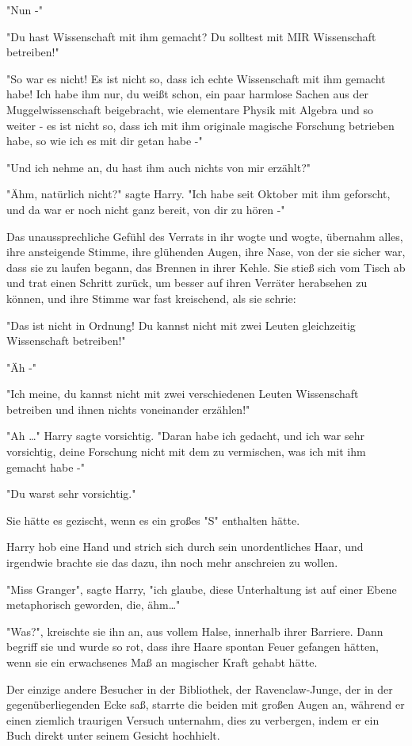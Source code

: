 {"Nun -"

"Du hast Wissenschaft mit ihm gemacht? Du solltest mit MIR Wissenschaft betreiben!"

"So war es nicht! Es ist nicht so, dass ich echte Wissenschaft mit ihm gemacht habe! Ich habe ihm nur, du weißt schon, ein paar harmlose Sachen aus der Muggelwissenschaft beigebracht, wie elementare Physik mit Algebra und so weiter - es ist nicht so, dass ich mit ihm originale magische Forschung betrieben habe, so wie ich es mit dir getan habe -"

"Und ich nehme an, du hast ihm auch nichts von mir erzählt?"

"Ähm, natürlich nicht?" sagte Harry. "Ich habe seit Oktober mit ihm geforscht, und da war er noch nicht ganz bereit, von dir zu hören -"

Das unaussprechliche Gefühl des Verrats in ihr wogte und wogte, übernahm alles, ihre ansteigende Stimme, ihre glühenden Augen, ihre Nase, von der sie sicher war, dass sie zu laufen begann, das Brennen in ihrer Kehle. Sie stieß sich vom Tisch ab und trat einen Schritt zurück, um besser auf ihren Verräter herabsehen zu können, und ihre Stimme war fast kreischend, als sie schrie:

"Das ist nicht in Ordnung! Du kannst nicht mit zwei Leuten gleichzeitig Wissenschaft betreiben!"

"Äh -"

"Ich meine, du kannst nicht mit zwei verschiedenen Leuten Wissenschaft betreiben und ihnen nichts voneinander erzählen!"

"Ah …" Harry sagte vorsichtig. "Daran habe ich gedacht, und ich war sehr vorsichtig, deine Forschung nicht mit dem zu vermischen, was ich mit ihm gemacht habe -"

"Du warst sehr vorsichtig."

Sie hätte es gezischt, wenn es ein großes "S" enthalten hätte.

Harry hob eine Hand und strich sich durch sein unordentliches Haar, und irgendwie brachte sie das dazu, ihn noch mehr anschreien zu wollen.

"Miss Granger", sagte Harry, "ich glaube, diese Unterhaltung ist auf einer Ebene metaphorisch geworden, die, ähm…"

"Was?", kreischte sie ihn an, aus vollem Halse, innerhalb ihrer Barriere. Dann begriff sie und wurde so rot, dass ihre Haare spontan Feuer gefangen hätten, wenn sie ein erwachsenes Maß an magischer Kraft gehabt hätte.

Der einzige andere Besucher in der Bibliothek, der Ravenclaw-Junge, der in der gegenüberliegenden Ecke saß, starrte die beiden mit großen Augen an, während er einen ziemlich traurigen Versuch unternahm, dies zu verbergen, indem er ein Buch direkt unter seinem Gesicht hochhielt.

}
